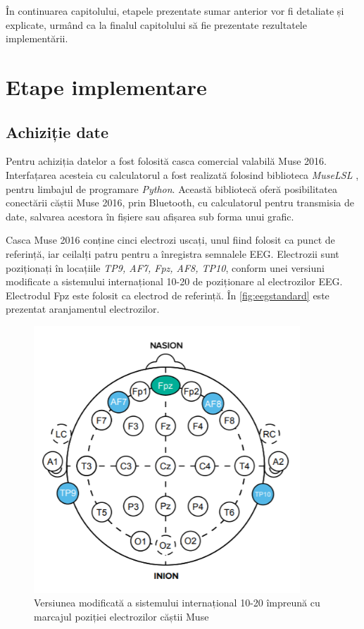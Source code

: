 În continuarea capitolului, etapele prezentate sumar anterior vor fi detaliate și explicate, urmând ca la finalul capitolului să fie prezentate rezultatele implementării.

\section{Etape implementare}

\subsection{Achiziție date}\label{subsec:achizitie-date}
Pentru achiziția datelor a fost folosită casca comercial valabilă Muse 2016. Interfațarea acesteia cu calculatorul a fost realizată folosind biblioteca \textit{MuseLSL} \cite{online:muselsl}, pentru limbajul de programare \textit{Python}. Această bibliotecă oferă posibilitatea conectării căștii Muse 2016, prin Bluetooth, cu calculatorul pentru transmisia de date, salvarea acestora în fișiere sau afișarea sub forma unui grafic.

Casca Muse 2016 conține cinci electrozi uscați, unul fiind folosit ca punct de referință, iar ceilalți patru pentru a înregistra semnalele EEG. Electrozii sunt poziționați în locațiile \textit{TP9, AF7, Fpz, AF8, TP10}, conform unei versiuni modificate a sistemului internațional 10-20 de poziționare al electrozilor EEG. Electrodul Fpz este folosit ca electrod de referință. În \autoref{fig:eegstandard} este prezentat aranjamentul electrozilor.

\begin{figure}[ht]
\centering
\includegraphics[width=10cm, keepaspectratio]{fig/cap3/EEGstandard.png}
\caption{Versiunea modificată a sistemului internațional 10-20 împreună cu marcajul poziției electrozilor căștii Muse \cite{online:muse-eeg}}
\label{fig:eegstandard}
\end{figure}


